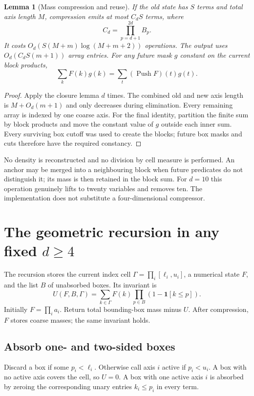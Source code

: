 \documentclass[12pt,a4paper]{article}
\newtheorem{lemma}[theorem]{Lemma}
\newcommand{\1}{\mathbf1}
\newcommand{\Push}{\operatorname{Push}}
\begin{document}
\begin{lemma}[Mass compression and reuse]\label{lem:push}
If the old state has $S$ terms and total axis length $M$, compression
emits at most $C_d S$ terms, where
\[
                           C_d=\prod_{p=d+1}^{2d}B_p.
\]
It costs $O_d(S(M+m)\log(M+m+2))$ operations. The output uses
$O_d(C_d S(m+1))$ array entries. For any future mask $g$ constant on
the current block products,
\[
                      \sum_k F(k)g(k)=\sum_t(\Push F)(t)g(t).
\]
\end{lemma}
\begin{proof}
Apply the closure lemma $d$ times. The combined old and new axis length is
$M+O_d(m+1)$ and only decreases during elimination. Every remaining array
is indexed by one coarse axis. For the final identity, partition the
finite sum by block products and move the constant value of $g$ outside
each inner sum. Every surviving box cutoff was used to create the blocks;
future box masks and cuts therefore have the required constancy.
\end{proof}
No density is reconstructed and no division by cell measure is performed.
An anchor may be merged into a neighbouring block when future predicates
do not distinguish it; its mass is then retained in the block sum.
For $d=10$ this operation genuinely lifts to twenty variables and removes
ten. The implementation does not substitute a four-dimensional compressor.

\section{The geometric recursion in any fixed $d\ge4$}
The recursion stores the current index cell $\Gamma=\prod_i[\ell_i,u_i]$,
a numerical state $F$, and the list $B$ of unabsorbed boxes. Its invariant is
\begin{equation}
U(F,B,\Gamma)=\sum_{k\in\Gamma}F(k)
                   \prod_{p\in B}(1-\1[k\le p]).   \label{eq:invariant}
\end{equation}
Initially $F=\prod_i a_i$. Return total bounding-box mass minus $U$.
After compression, $F$ stores coarse masses; the same invariant holds.

\subsection{Absorb one- and two-sided boxes}
Discard a box if some $p_i<\ell_i$. Otherwise call axis $i$ active if
$p_i<u_i$. A box with no active axis covers the cell, so $U=0$.
A box with one active axis $i$ is absorbed by zeroing the corresponding
unary entries $k_i\le p_i$ in every term.
\end{document}
